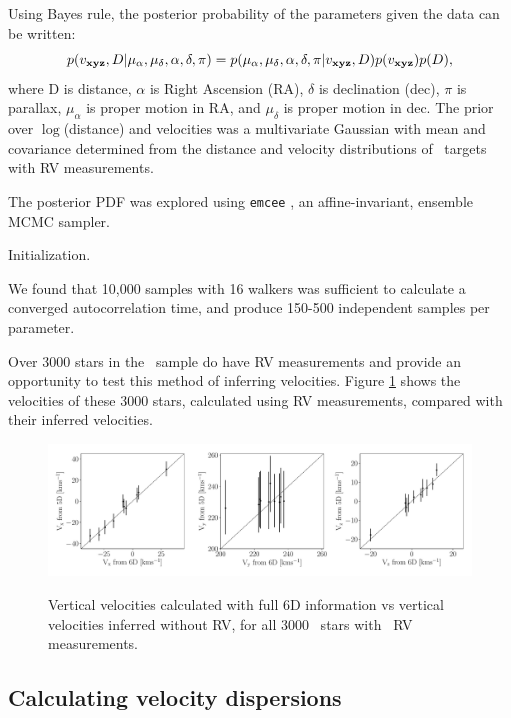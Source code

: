 Using Bayes rule, the posterior probability of the parameters given the data
can be written:
\begin{equation}
p(v_{\bf xyz}, D | \mu_{\alpha}, \mu_{\delta}, \alpha, \delta, \pi) =
    p(\mu_{\alpha}, \mu_{\delta}, \alpha, \delta, \pi | v_{\bf xyz}, D)
    p(v_{\bf xyz}) p(D),
\end{equation}
where D is distance, $\alpha$ is Right Ascension (RA), $\delta$ is declination
(dec), $\pi$ is parallax, $\mu_\alpha$ is proper motion in RA, and
$\mu_\delta$ is proper motion in dec.
The prior over $\log$(distance) and velocities was a multivariate Gaussian
with mean and covariance determined from the distance and velocity
distributions of \kepler\ targets with RV measurements.

The posterior PDF was explored using {\tt emcee} \citep{foreman-mackey2013},
an affine-invariant, ensemble MCMC sampler.

Initialization.

We found that 10,000 samples with 16 walkers was sufficient to calculate a
converged autocorrelation time, and produce 150-500 independent samples per
parameter.

Over 3000 stars in the \mct\ sample do have RV measurements and provide an
opportunity to test this method of inferring velocities.
Figure \ref{fig:v_comparison} shows the velocities of these 3000 stars,
calculated using RV measurements, compared with their inferred velocities.

\begin{figure}[ht!]
\caption{Vertical velocities calculated with full 6D information vs vertical
    velocities inferred without RV, for all 3000 \mct\ stars with \gaia\ RV
    measurements.}
  \centering
    \includegraphics[width=1\textwidth]{v_comparison}
\label{fig:v_comparison}
\end{figure}

\subsection{Calculating velocity dispersions}
\label{sec:velocity_dispersion}

